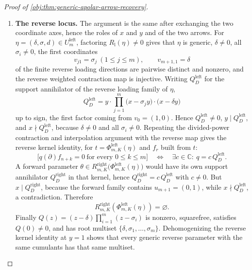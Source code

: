 \documentclass[11pt]{article}
\begin{document}
\begin{proof}[Proof of \cref{obj:thm:generic-apolar-arrow-recovery}]
\begin{enumerate}
\item \textbf{The reverse locus.}  The argument is the same after exchanging the two coordinate axes, hence the roles of \(x\) and \(y\) and of the two arrows.  For \(\eta=(\delta,\sigma,d)\in U^{\mathrm{left}}_m\), factoring \(R_{\mathrm l}(\eta)\ne0\) gives that \(\eta\) is generic, \(\delta\ne0\), all \(\sigma_i\ne0\), the first coordinates
\[
v_{j1}=\sigma_j\ (1\le j\le m),
\qquad
v_{m+1,1}=\delta
\]
of the finite reverse loading directions are pairwise distinct and nonzero, and the reverse weighted contraction map is injective.  Writing \(Q_D^{\mathrm{left}}\) for the support annihilator of the reverse loading family of \(\eta\),
\[
Q_D^{\mathrm{left}}=y\cdot\prod_{j=1}^{m}\bigl(x-\sigma_jy\bigr)\cdot\bigl(x-\delta y\bigr)
\]
up to sign, the first factor coming from \(v_0=(1,0)\).  Hence \(Q_D^{\mathrm{left}}\ne0\), \(y\mid Q_D^{\mathrm{left}}\), and \(x\nmid Q_D^{\mathrm{left}}\), because \(\delta\ne0\) and all \(\sigma_i\ne0\).  Repeating the divided-power contraction and interpolation argument with the reverse map gives the reverse kernel identity, for \(t=\Phi^{\mathrm{left}}_{m,K}(\eta)\) and \(f_r\) built from \(t\):
\[
\bigl[q(\partial)f_{n+k}=0\ \text{for every }0\le k\le m\bigr]
\quad\Longleftrightarrow\quad
\exists c\in\mathbb C:\ q=c\,Q_D^{\mathrm{left}} .
\]
A forward parameter \(\theta\in R^{\mathrm{right}}_{m,K}\bigl(\Phi^{\mathrm{left}}_{m,K}(\eta)\bigr)\) would have its own support annihilator \(Q_D^{\mathrm{right}}\) in that kernel, hence \(Q_D^{\mathrm{right}}=c\,Q_D^{\mathrm{left}}\) with \(c\ne0\).  But \(x\mid Q_D^{\mathrm{right}}\), because the forward family contains \(u_{m+1}=(0,1)\), while \(x\nmid Q_D^{\mathrm{left}}\), a contradiction.  Therefore
\[
R^{\mathrm{right}}_{m,K}\!\left(\Phi^{\mathrm{left}}_{m,K}(\eta)\right)=\varnothing .
\]
Finally \(Q(z)=(z-\delta)\prod_{i=1}^m(z-\sigma_i)\) is nonzero, squarefree, satisfies \(Q(0)\ne0\), and has root multiset \(\{\delta,\sigma_1,\ldots,\sigma_m\}\).  Dehomogenizing the reverse kernel identity at \(y=1\) shows that every generic reverse parameter with the same cumulants has that same multiset.
\end{enumerate}
\end{proof}




\end{document}
